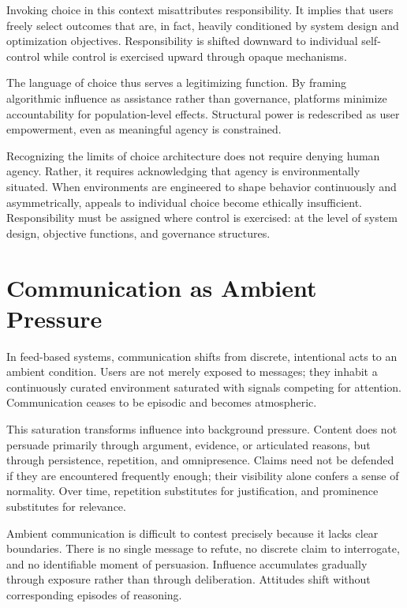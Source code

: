 \documentclass[12pt]{article}
\begin{document}
Invoking choice in this context misattributes responsibility. It implies that users freely select outcomes that are, in fact, heavily conditioned by system design and optimization objectives. Responsibility is shifted downward to individual self-control while control is exercised upward through opaque mechanisms.

The language of choice thus serves a legitimizing function. By framing algorithmic influence as assistance rather than governance, platforms minimize accountability for population-level effects. Structural power is redescribed as user empowerment, even as meaningful agency is constrained.

Recognizing the limits of choice architecture does not require denying human agency. Rather, it requires acknowledging that agency is environmentally situated. When environments are engineered to shape behavior continuously and asymmetrically, appeals to individual choice become ethically insufficient. Responsibility must be assigned where control is exercised: at the level of system design, objective functions, and governance structures.

\section{Communication as Ambient Pressure}

In feed-based systems, communication shifts from discrete, intentional acts to an ambient condition. Users are not merely exposed to messages; they inhabit a continuously curated environment saturated with signals competing for attention. Communication ceases to be episodic and becomes atmospheric.

This saturation transforms influence into background pressure. Content does not persuade primarily through argument, evidence, or articulated reasons, but through persistence, repetition, and omnipresence. Claims need not be defended if they are encountered frequently enough; their visibility alone confers a sense of normality. Over time, repetition substitutes for justification, and prominence substitutes for relevance.

Ambient communication is difficult to contest precisely because it lacks clear boundaries. There is no single message to refute, no discrete claim to interrogate, and no identifiable moment of persuasion. Influence accumulates gradually through exposure rather than through deliberation. Attitudes shift without corresponding episodes of reasoning.
\end{document}
